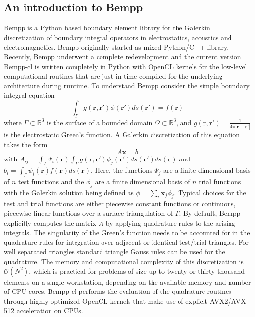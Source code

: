 \subsection{An introduction to Bempp}
Bempp \cite{Betcke2020} is a Python based boundary element library for the Galerkin discretization of boundary integral operators in electrostatics, acoustics and electromagnetics.
Bempp originally started as mixed Python/C++ library.
Recently, Bempp underwent a complete redevelopment and the current version Bempp-cl is written completely in Python with OpenCL kernels for the low-level computational routines that are just-in-time compiled for the underlying architecture during runtime.
To understand Bempp consider the simple boundary integral equation
$$
\int_{\Gamma} g(\mathbf{r}, \mathbf{r'}) \phi(\mathbf{r'})ds(\mathbf{r'}) = f(\mathbf{r})
$$
where $\Gamma\subset\mathbb{R}^3$ is the surface of a bounded domain $\Omega\subset\mathbb{R}^3$, and $g(\mathbf{r}, \mathbf{r'}) = \frac{1}{4\pi|\mathbf{r}-\mathbf{r'}|}$ is the electrostatic Green's function.
A Galerkin discretization of this equation takes the form
$$
A\mathbf{x} = b
$$
with $A_{ij} = \int_{\Gamma}\Psi_i(\mathbf{r})\int_{\Gamma}g(\mathbf{r}, \mathbf{r'})\phi_j(\mathbf{r'})ds(\mathbf{r'})ds(\mathbf{r})$ and $b_i = \int_{\Gamma}\psi_i(\mathbf{r})f(\mathbf{r})ds(\mathbf{r})$.
Here, the functions $\Psi_j$ are a finite dimensional basis of $n$ test functions and the $\phi_j$ are a finite dimensional basis of $n$ trial functions with the Galerkin solution being defined as $\phi=\sum_{i}\mathbf{x}_j\phi_j$.
Typical choices for the test and trial functions are either piecewise constant functions or continuous, piecewise linear functions over a surface triangulation of $\Gamma$. 
By default, Bempp explicitly computes the matrix $A$ by applying quadrature rules to the arising integrals.
The singularity of the Green's function needs to be accounted for in the quadrature rules for integration over adjacent or identical test/trial triangles.
For well separated triangles standard triangle Gauss rules can be used for the quadrature.
The memory and computational complexity of this discretization is $\mathcal{O}(N^2)$, which is practical for problems of size up to twenty or thirty thousand elements on a single workstation, depending on the available memory and number of CPU cores.
Bempp-cl performs the evaluation of the quadrature routines through highly optimized OpenCL kernels that make use of explicit AVX2/AVX-512 acceleration on CPUs.

